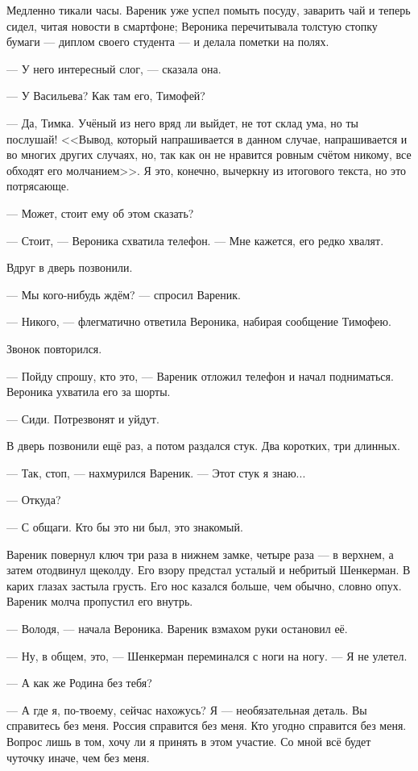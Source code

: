 Медленно тикали часы.
Вареник уже успел помыть посуду, заварить чай и теперь сидел, читая новости в смартфоне;
Вероника перечитывала толстую стопку бумаги --- диплом своего студента --- и делала пометки на полях.

--- У него интересный слог, --- сказала она.

--- У Васильева?
Как там его, Тимофей?

--- Да, Тимка.
Учёный из него вряд ли выйдет, не тот склад ума, но ты послушай!
<<Вывод, который напрашивается в данном случае, напрашивается и во многих других случаях, но, так как он не нравится ровным счётом никому, все обходят его молчанием>>.
Я это, конечно, вычеркну из итогового текста, но это потрясающе.

--- Может, стоит ему об этом сказать?

--- Стоит, --- Вероника схватила телефон.
--- Мне кажется, его редко хвалят.

Вдруг в дверь позвонили.

--- Мы кого-нибудь ждём? --- спросил Вареник.

--- Никого, --- флегматично ответила Вероника, набирая сообщение Тимофею.

Звонок повторился.

--- Пойду спрошу, кто это, --- Вареник отложил телефон и начал подниматься.
Вероника ухватила его за шорты.

--- Сиди.
Потрезвонят и уйдут.

В дверь позвонили ещё раз, а потом раздался стук.
Два коротких, три длинных.

--- Так, стоп, --- нахмурился Вареник.
--- Этот стук я знаю...

--- Откуда?

--- С общаги.
Кто бы это ни был, это знакомый.

Вареник повернул ключ три раза в нижнем замке, четыре раза --- в верхнем, а затем отодвинул щеколду.
Его взору предстал усталый и небритый Шенкерман.
В карих глазах застыла грусть.
Его нос казался больше, чем обычно, словно опух.
Вареник молча пропустил его внутрь.

--- Володя, --- начала Вероника.
Вареник взмахом руки остановил её.

--- Ну, в общем, это, --- Шенкерман переминался с ноги на ногу.
--- Я не улетел.

--- А как же Родина без тебя?

--- А где я, по-твоему, сейчас нахожусь?
Я --- необязательная деталь.
Вы справитесь без меня.
Россия справится без меня.
Кто угодно справится без меня.
Вопрос лишь в том, хочу ли я принять в этом участие.
Со мной всё будет чуточку иначе, чем без меня.

